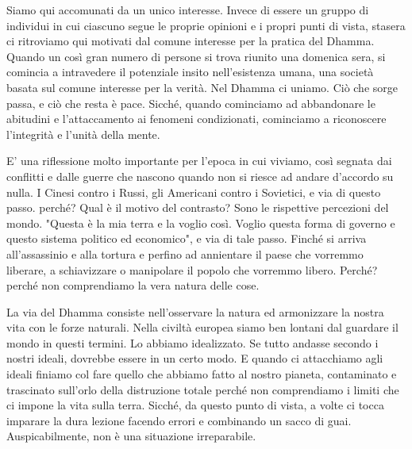 
Siamo qui accomunati da un unico interesse. Invece di essere un gruppo
di individui in cui ciascuno segue le proprie opinioni e i propri punti
di vista, stasera ci ritroviamo qui motivati dal comune interesse per la
pratica del Dhamma. Quando un così gran numero di persone si trova
riunito una domenica sera, si comincia a intravedere il potenziale
insito nell'esistenza umana, una società basata sul comune interesse per
la verità. Nel Dhamma ci uniamo. Ciò che sorge passa, e ciò che resta è
pace. Sicché, quando cominciamo ad abbandonare le abitudini e
l'attaccamento ai fenomeni condizionati, cominciamo a riconoscere
l'integrità e l'unità della mente.

E' una riflessione molto importante per l'epoca in cui viviamo, così
segnata dai conflitti e dalle guerre che nascono quando non si riesce ad
andare d'accordo su nulla. I Cinesi contro i Russi, gli Americani contro
i Sovietici, e via di questo passo. perché? Qual è il motivo del
contrasto? Sono le rispettive percezioni del mondo. "Questa è la mia
terra e la voglio così. Voglio questa forma di governo e questo sistema
politico ed economico", e via di tale passo. Finché si arriva
all'assassinio e alla tortura e perfino ad annientare il paese che
vorremmo liberare, a schiavizzare o manipolare il popolo che vorremmo
libero. Perché? perché non comprendiamo la vera natura delle cose.

La via del Dhamma consiste nell'osservare la natura ed armonizzare la
nostra vita con le forze naturali. Nella civiltà europea siamo ben
lontani dal guardare il mondo in questi termini. Lo abbiamo idealizzato.
Se tutto andasse secondo i nostri ideali, dovrebbe essere in un certo
modo. E quando ci attacchiamo agli ideali finiamo col fare quello che
abbiamo fatto al nostro pianeta, contaminato e trascinato sull'orlo
della distruzione totale perché non comprendiamo i limiti che ci impone
la vita sulla terra. Sicché, da questo punto di vista, a volte ci tocca
imparare la dura lezione facendo errori e combinando un sacco di guai.
Auspicabilmente, non è una situazione irreparabile.

